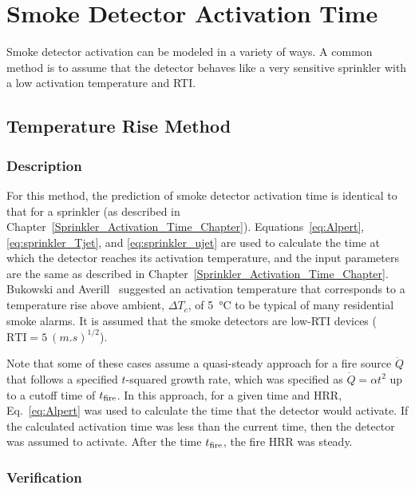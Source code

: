 
\chapter{Smoke Detector Activation Time}
\label{Smoke_Detector_Activation_Time_Chapter}

Smoke detector activation can be modeled in a variety of ways. A common method is to assume that the detector behaves like a very sensitive sprinkler with a low activation temperature and RTI.

\section{Temperature Rise Method}
\label{sec:Temperature_Rise}

\subsection*{Description}

For this method, the prediction of smoke detector activation time is identical to that for a sprinkler (as described in Chapter~\ref{Sprinkler_Activation_Time_Chapter}). Equations~\ref{eq:Alpert}, \ref{eq:sprinkler_Tjet}, and \ref{eq:sprinkler_ujet} are used to calculate the time at which the detector reaches its activation temperature, and the input parameters are the same as described in Chapter~\ref{Sprinkler_Activation_Time_Chapter}. Bukowski and Averill~\cite{Bukowski:2} suggested an activation temperature that corresponds to a temperature rise above ambient, $\Delta T_c$, of \SI{5}{\celsius} to be typical of many residential smoke alarms. It is assumed that the smoke detectors are low-RTI devices ($\textrm{RTI}=5~\si{(m.s)^{1/2}}$).

Note that some of these cases assume a quasi-steady approach for a fire source $\dot Q$ that follows a specified $t$-squared growth rate, which was specified as $\dot Q = \alpha t^2$ up to a cutoff time of $t\sb{fire}$. In this approach, for a given time and HRR, Eq.~\ref{eq:Alpert} was used to calculate the time that the detector would activate. If the calculated activation time was less than the current time, then the detector was assumed to activate. After the time $t\sb{fire}$, the fire HRR was steady.


\clearpage


\subsection*{Verification}

